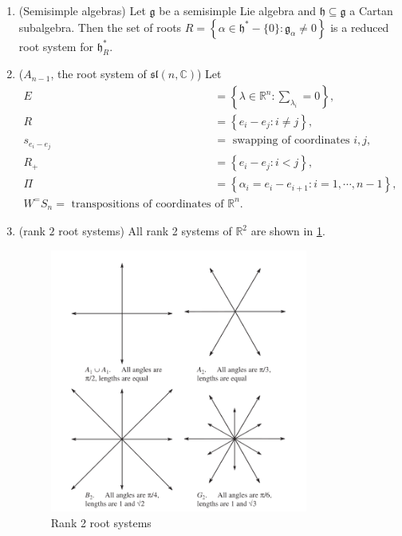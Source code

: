 \documentclass{report}
\begin{document}
\begin{example}
    \begin{enumerate}[label = (\roman*)]
        \item (Semisimple algebras) Let $\mathfrak g$ be a semisimple Lie algebra and $\mathfrak h \subseteq \mathfrak g$ a Cartan subalgebra.
        Then the set of roots $R = \left\{ \alpha \in \mathfrak h^* - \{0\} : \mathfrak g_\alpha \neq 0 \right\}$ is a reduced root system for $\mathfrak h_{R}^*$.
        \item ($A_{n - 1}$, the root system of $\mathfrak{sl}(n, \mathbb C)$) Let
        \begin{align*}
            E &= \left\{\lambda \in \mathbb R^n: \sum_{\lambda_i} = 0\right\},\\
            R &= \left\{e_i - e_j: i\neq j\right\},\\
            s_{e_i - e_j} &= \text{ swapping of coordinates } i, j,\\
            R_+ &= \left\{e_i - e_j: i < j\right\},\\
            \Pi &= \left\{\alpha_i = e_i - e_{i+1}: i = 1, \cdots, n-1\right\},\\
            W ^= S_n = \text{ transpositions of coordinates of } \mathbb R^n.
        \end{align*}
        \item (rank $2$ root systems) All rank 2 systems of $\mathbb R^2$ are shown in \cref{fig:rank_two_systems}.
        \begin{figure}[h]
            \centering
            \includegraphics[width=0.8\textwidth]{rank two root systems.png}
            \caption{Rank 2 root systems}
            \label{fig:rank_two_systems}
        \end{figure}
        
    \end{enumerate}
\end{example}
\end{document}
